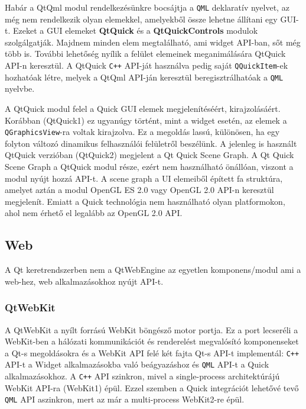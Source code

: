\documentclass[12pt]{report}
\begin{document}
Habár a QtQml modul rendelkezésünkre bocsájtja a \texttt{QML} deklaratív nyelvet, az még
nem rendelkezik olyan elemekkel, amelyekből össze lehetne állítani egy GUI-t. Ezeket a
GUI elemeket \textbf{QtQuick} és a \textbf{QtQuickControls} modulok szolgálgatják.
Majdnem minden elem megtalálható, ami widget API-ban, sőt még több is. További lehetőség
nyílik a felület elemeinek meganimálására QtQuick API-n keresztül.
A QtQuick \texttt{C++} API-ját használva pedig saját \texttt{QQuickItem}-ek hozhatóak létre,
melyek a QtQml API-ján keresztül beregisztrálhatóak a \texttt{QML} nyelvbe.
\cite{bib:qt-doc-qt-quick}

A QtQuick modul felel a Quick GUI elemek megjelenítéséért, kirajzolásáért.
Korábban (QtQuick1) ez ugyanúgy történt, mint a widget esetén, az elemek a \\
\texttt{QGraphicsView}-ra voltak kirajzolva. Ez a megoldás lassú, különösen, ha egy folyton
változó dinamikus felhasználói felületről beszélünk. A jelenleg is használt QtQuick verzióban
(QtQuick2) megjelent a Qt Quick Scene Graph. A Qt Quick Scene Graph a QtQuick modul része,
ezért nem használható önállóan, viszont a modul nyújt hozzá API-t. A scene graph a UI
elemeiből épített fa struktúra, amelyet aztán a modul OpenGL ES 2.0 vagy OpenGL 2.0
API-n keresztül megjelenít. Emiatt a Quick technológia nem használható olyan platformokon,
ahol nem érhető el legalább az OpenGL 2.0 API.
\cite{bib:qt-doc-qt-quick-scene-graph}

\subsection{Web}
A Qt keretrendszerben nem a QtWebEngine az egyetlen komponens/modul ami a
web-hez, web alkalmazásokhoz nyújt API-t.

\subsubsection{QtWebKit}
A QtWebKit a nyílt forrású WebKit böngésző motor portja. Ez a port lecseréli a WebKit-ben
a hálózati kommunikációt és renderelést megvalósító komponenseket a Qt-s megoldásokra és
a WebKit API felé két fajta Qt-s API-t implementál:
\texttt{C++} API-t a Widget alkalmazásokba való beágyazáshoz és \texttt{QML} API-t a Quick
alkalmazásokhoz.
A \texttt{C++} API szinkron, mivel a single-process architektúrájú WebKit API-ra (WebKit1)
épül. Ezzel szemben a Quick integrációt lehetővé tevő \texttt{QML} API aszinkron, mert az már
a multi-process WebKit2-re épül.
\end{document}
